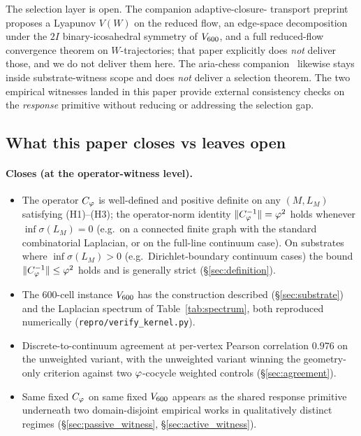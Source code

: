 The selection layer is open. The companion adaptive-closure-
transport preprint~\citep{SmartAdaptiveClosureTransport2026}
proposes a Lyapunov $V(W)$ on the reduced flow, an edge-space
decomposition under the $2I$ binary-icosahedral symmetry of
$V_{600}$, and a full reduced-flow convergence theorem on
$W$-trajectories; that paper explicitly does \emph{not} deliver
those, and we do not deliver them here. The aria-chess
companion~\citep{SmartAriaChess2026} likewise stays inside
substrate-witness scope and does \emph{not} deliver a selection
theorem. The two empirical witnesses landed in this paper provide
external consistency checks on the \emph{response} primitive
without reducing or addressing the selection gap.

\subsection{What this paper closes vs leaves open}

\paragraph{Closes (at the operator-witness level).}
\begin{itemize}\itemsep=2pt
\item The operator $C_{\varphi}$ is well-defined and positive definite
  on any $(M, L_M)$ satisfying (H1)--(H3); the operator-norm
  identity $\|C_{\varphi}^{-1}\| = \varphi^{2}$ holds whenever
  $\inf \sigma(L_M) = 0$ (e.g.\ on a connected finite graph with
  the standard combinatorial Laplacian, or on the full-line
  continuum case). On substrates where $\inf \sigma(L_M) > 0$
  (e.g.\ Dirichlet-boundary continuum cases) the bound
  $\|C_{\varphi}^{-1}\| \leq \varphi^{2}$ holds and is generally strict
  (\S\ref{sec:definition}).
\item The 600-cell instance $V_{600}$ has the construction
  described (\S\ref{sec:substrate}) and the Laplacian spectrum of
  Table~\ref{tab:spectrum}, both reproduced numerically
  (\texttt{repro/verify\_kernel.py}).
\item Discrete-to-continuum agreement at per-vertex Pearson
  correlation $0.976$ on the unweighted variant, with the unweighted
  variant winning the geometry-only criterion against two
  $\varphi$-cocycle weighted controls (\S\ref{sec:agreement}).
\item Same fixed $C_{\varphi}$ on same fixed $V_{600}$ appears as
  the shared response primitive underneath two domain-disjoint empirical works in
  qualitatively distinct regimes (\S\ref{sec:passive_witness},
  \S\ref{sec:active_witness}).
\end{itemize}

